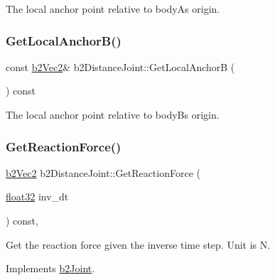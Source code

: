 The local anchor point relative to bodyA\textquotesingle{}s origin. 

\mbox{\label{classb2_distance_joint_a214a1cca8854613d7401c9a5892a28c9}} 
\subsubsection{\texorpdfstring{GetLocalAnchorB()}{GetLocalAnchorB()}}
{\footnotesize\ttfamily const \mbox{\hyperlink{structb2_vec2}{b2\+Vec2}}\& b2\+Distance\+Joint\+::\+Get\+Local\+AnchorB (\begin{DoxyParamCaption}{ }\end{DoxyParamCaption}) const\hspace{0.3cm}{\ttfamily [inline]}}



The local anchor point relative to bodyB\textquotesingle{}s origin. 

\mbox{\label{classb2_distance_joint_a6aa951e5bbfcae8a617987955cadbed5}} 
\subsubsection{\texorpdfstring{GetReactionForce()}{GetReactionForce()}}
{\footnotesize\ttfamily \mbox{\hyperlink{structb2_vec2}{b2\+Vec2}} b2\+Distance\+Joint\+::\+Get\+Reaction\+Force (\begin{DoxyParamCaption}\item[{\mbox{\hyperlink{b2_settings_8h_aacdc525d6f7bddb3ae95d5c311bd06a1}{float32}}}]{inv\+\_\+dt }\end{DoxyParamCaption}) const\hspace{0.3cm}{\ttfamily [override]}, {\ttfamily [virtual]}}

Get the reaction force given the inverse time step. Unit is N. 

Implements \mbox{\hyperlink{classb2_joint_a7e0eddefb9b69ad050b8ef6425838a74}{b2\+Joint}}.

\mbox{\label{classb2_distance_joint_ad7ac78c4c20c122b944947d523a02982}} 
